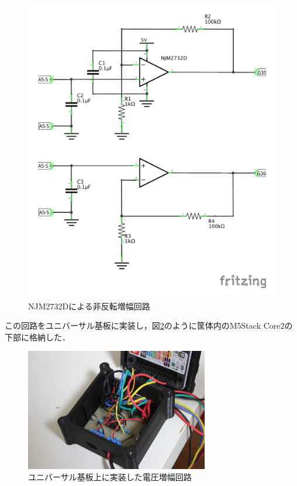 \begin{figure}[H]
  \begin{center}
    \includegraphics[width=12cm]{fig/a-5s_opamp_schematic}
    \caption{NJM2732Dによる非反転増幅回路}
    \label{fig:a-5s_opamp_schematic}
  \end{center}
\end{figure}

この回路をユニバーサル基板に実装し，図\ref{fig:opamp_universal}のように筐体内のM5Stack Core2の下部に格納した．

\begin{figure}[H]
  \begin{center}
    \includegraphics[width=8cm]{fig/opamp_universal}
    \caption{ユニバーサル基板上に実装した電圧増幅回路}
    \label{fig:opamp_universal}
  \end{center}
\end{figure}

